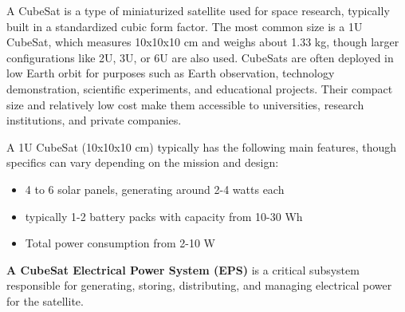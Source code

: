 \documentclass[11pt, a4paper]{article}
\begin{document}
A CubeSat is a type of miniaturized satellite used for space research, typically built in a standardized cubic form factor. The most common size is a 1U CubeSat, which measures 10x10x10 cm and weighs about 1.33 kg, though larger configurations like 2U, 3U, or 6U are also used. CubeSats are often deployed in low Earth orbit for purposes such as Earth observation, technology demonstration, scientific experiments, and educational projects. Their compact size and relatively low cost make them accessible to universities, research institutions, and private companies.

A 1U CubeSat (10x10x10 cm) typically has the following main features, though specifics can vary depending on the mission and design:
\begin{itemize}
\item  4 to 6 solar panels, generating around 2-4 watts each

\item typically 1-2 battery packs with capacity from 10-30 Wh

\item Total power consumption from 2-10 W
\end{itemize}
\textbf{A CubeSat Electrical Power System (EPS)} is a critical subsystem responsible for generating, storing, distributing, and managing electrical power for the satellite.
\end{document}
